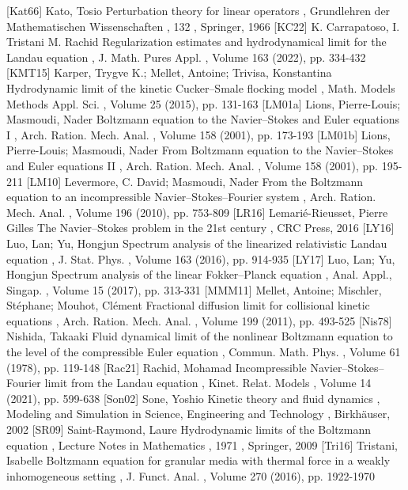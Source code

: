  [Kat66] Kato, Tosio Perturbation theory for linear operators , Grundlehren der Mathematischen Wissenschaften , 132 , Springer, 1966
 [KC22] K. Carrapatoso, I. Tristani M. Rachid Regularization estimates and hydrodynamical limit for the Landau equation , J. Math. Pures Appl. , Volume 163 (2022), pp. 334-432
 [KMT15] Karper, Trygve K.; Mellet, Antoine; Trivisa, Konstantina Hydrodynamic limit of the kinetic Cucker–Smale flocking model , Math. Models Methods Appl. Sci. , Volume 25 (2015), pp. 131-163
 [LM01a] Lions, Pierre-Louis; Masmoudi, Nader Boltzmann equation to the Navier–Stokes and Euler equations I , Arch. Ration. Mech. Anal. , Volume 158 (2001), pp. 173-193
 [LM01b] Lions, Pierre-Louis; Masmoudi, Nader From Boltzmann equation to the Navier–Stokes and Euler equations II , Arch. Ration. Mech. Anal. , Volume 158 (2001), pp. 195-211
 [LM10] Levermore, C. David; Masmoudi, Nader From the Boltzmann equation to an incompressible Navier–Stokes–Fourier system , Arch. Ration. Mech. Anal. , Volume 196 (2010), pp. 753-809
 [LR16] Lemarié-Rieusset, Pierre Gilles The Navier–Stokes problem in the 21st century , CRC Press, 2016
 [LY16] Luo, Lan; Yu, Hongjun Spectrum analysis of the linearized relativistic Landau equation , J. Stat. Phys. , Volume 163 (2016), pp. 914-935
 [LY17] Luo, Lan; Yu, Hongjun Spectrum analysis of the linear Fokker–Planck equation , Anal. Appl., Singap. , Volume 15 (2017), pp. 313-331
 [MMM11] Mellet, Antoine; Mischler, Stéphane; Mouhot, Clément Fractional diffusion limit for collisional kinetic equations , Arch. Ration. Mech. Anal. , Volume 199 (2011), pp. 493-525
 [Nis78] Nishida, Takaaki Fluid dynamical limit of the nonlinear Boltzmann equation to the level of the compressible Euler equation , Commun. Math. Phys. , Volume 61 (1978), pp. 119-148
 [Rac21] Rachid, Mohamad Incompressible Navier–Stokes–Fourier limit from the Landau equation , Kinet. Relat. Models , Volume 14 (2021), pp. 599-638
 [Son02] Sone, Yoshio Kinetic theory and fluid dynamics , Modeling and Simulation in Science, Engineering and Technology , Birkhäuser, 2002
 [SR09] Saint-Raymond, Laure Hydrodynamic limits of the Boltzmann equation , Lecture Notes in Mathematics , 1971 , Springer, 2009
 [Tri16] Tristani, Isabelle Boltzmann equation for granular media with thermal force in a weakly inhomogeneous setting , J. Funct. Anal. , Volume 270 (2016), pp. 1922-1970
